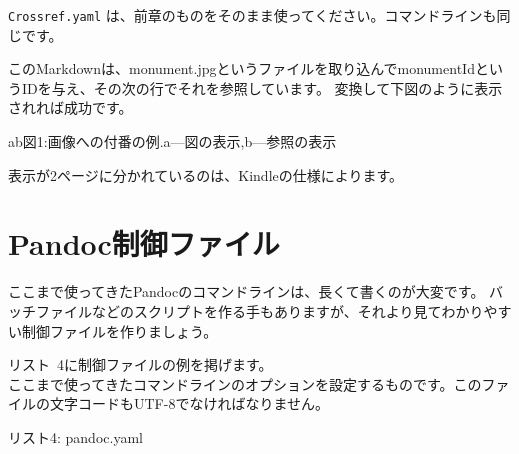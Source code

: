 \texttt{Crossref.yaml}
は、前章のものをそのまま使ってください。コマンドラインも同じです。

このMarkdownは、monument.jpgというファイルを取り込んでmonumentIdというIDを与え、その次の行でそれを参照しています。
変換して下図のように表示されれば成功です。

ab図1:画像への付番の例.a---図の表示,b---参照の表示

表示が2ページに分かれているのは、Kindleの仕様によります。

\section{Pandoc制御ファイル}\label{pandocux5236ux5fa1ux30d5ux30a1ux30a4ux30eb}

ここまで使ってきたPandocのコマンドラインは、長くて書くのが大変です。
バッチファイルなどのスクリプトを作る手もありますが、それより見てわかりやすい制御ファイルを作りましょう。

リスト~4に制御ファイルの例を掲げます。\\
ここまで使ってきたコマンドラインのオプションを設定するものです。このファイルの文字コードもUTF-8でなければなりません。

リスト4: pandoc.yaml

\begin{Shaded}
\begin{Highlighting}[]

\KeywordTok{:}
\AttributeTok{    }\KeywordTok{{-}}
\KeywordTok{:}
\KeywordTok{:}\AttributeTok{ }
\KeywordTok{:}
\AttributeTok{    }\KeywordTok{{-}}
\KeywordTok{:}
\AttributeTok{    }\KeywordTok{:}\AttributeTok{ }
\AttributeTok{    }\KeywordTok{:}\AttributeTok{ }
\AttributeTok{    }\KeywordTok{:}\AttributeTok{ }
\end{Highlighting}
\end{Shaded}

